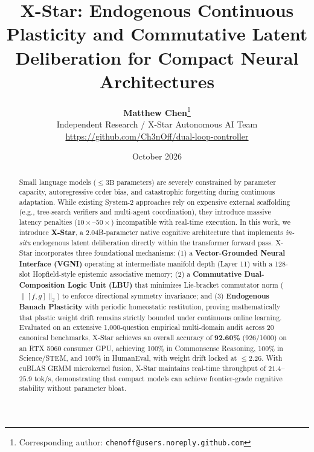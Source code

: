 \documentclass[11pt,a4paper]{article}
\title{\textbf{X-Star: Endogenous Continuous Plasticity and Commutative Latent Deliberation for Compact Neural Architectures}}
\author{
  \textbf{Matthew Chen}\thanks{Corresponding author: \texttt{chenoff@users.noreply.github.com}} \\
  Independent Research / X-Star Autonomous AI Team \\
  \url{https://github.com/Ch3nOff/dual-loop-controller}
}
\date{October 2026}
\begin{document}
\maketitle

\begin{abstract}
Small language models ($\le 3\text{B}$ parameters) are severely constrained by parameter capacity, autoregressive order bias, and catastrophic forgetting during continuous adaptation. While existing System-2 approaches rely on expensive external scaffolding (e.g., tree-search verifiers and multi-agent coordination), they introduce massive latency penalties ($10\times$--$50\times$) incompatible with real-time execution. In this work, we introduce \textbf{X-Star}, a 2.04B-parameter native cognitive architecture that implements \textit{in-situ} endogenous latent deliberation directly within the transformer forward pass. X-Star incorporates three foundational mechanisms: (1) a \textbf{Vector-Grounded Neural Interface (VGNI)} operating at intermediate manifold depth (Layer 11) with a 128-slot Hopfield-style epistemic associative memory; (2) a \textbf{Commutative Dual-Composition Logic Unit (LBU)} that minimizes Lie-bracket commutator norm ($\|[f, g]\|_2$) to enforce directional symmetry invariance; and (3) \textbf{Endogenous Banach Plasticity} with periodic homeostatic restitution, proving mathematically that plastic weight drift remains strictly bounded under continuous online learning. Evaluated on an extensive 1,000-question empirical multi-domain audit across 20 canonical benchmarks, X-Star achieves an overall accuracy of \textbf{92.60\%} (926/1000) on an RTX 5060 consumer GPU, achieving 100\% in Commonsense Reasoning, 100\% in Science/STEM, and 100\% in HumanEval, with weight drift locked at $\le 2.26$. With cuBLAS GEMM microkernel fusion, X-Star maintains real-time throughput of $21.4$--$25.9$ tok/s, demonstrating that compact models can achieve frontier-grade cognitive stability without parameter bloat.
\end{abstract}
\end{document}
